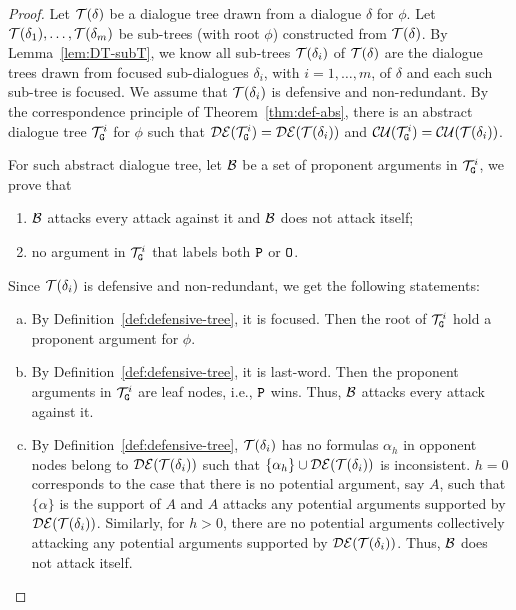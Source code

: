   \begin{proof}
  
  
  Let $\mathcal{T}(\delta)$ be a dialogue tree drawn from a dialogue $\delta$ for $\phi$. Let $\mathcal{T}(\delta_1), \ldots , \mathcal{T}(\delta_m)$ be sub-trees (with root $\phi$) constructed from $\mathcal{T}(\delta)$. By Lemma~\ref{lem:DT-subT}, we know all sub-trees $\mathcal{T}(\delta_i)$ of $\mathcal{T}(\delta)$ are the dialogue trees drawn from focused sub-dialogues $\delta_i$, with $i = 1, \ldots, m$, of $\delta$ and each such sub-tree is focused. We assume that $\mathcal{T}(\delta_i)$ is defensive and non-redundant.
%
  By the correspondence principle of Theorem~\ref{thm:def-abs},  there is an abstract dialogue tree $\mathcal{T}_{\texttt{\textup{G}}}^{i}$ for $\phi$ such that $\mathcal{DE}(\mathcal{T}_{\texttt{\textup{G}}}^{i})  =  \mathcal{DE}(\mathcal{T}(\delta_i))$ and $\mathcal{CU}(\mathcal{T}_{\texttt{\textup{G}}}^{i})  =  \mathcal{CU}(\mathcal{T}(\delta_ i))$.
  
  For such abstract dialogue tree, let $\mathcal{B}$ be a set of proponent arguments in $\mathcal{T}_{\texttt{\textup{G}}}^{i}$, we prove that 
  \begin{enumerate}
      \item $\mathcal{B}$ attacks every attack against it and $\mathcal{B}$ does not attack itself;
      \item no argument in $\mathcal{T}_{\texttt{\textup{G}}}^{i}$ that labels both $\texttt{\textup{P}}$ or $\texttt{\textup{O}}$.
  \end{enumerate}

 Since $\mathcal{T}(\delta_i)$ is defensive and non-redundant, we get the following statements:
  
  \begin{enumerate} [a)]
        \item By Definition~\ref{def:defensive-tree}, it is focused. Then the root of $\mathcal{T}_{\texttt{\textup{G}}}^{i}$ hold a proponent argument for $\phi$.
        
      \item By Definition~\ref{def:defensive-tree}, it is last-word. Then the proponent arguments in $\mathcal{T}_{\texttt{\textup{G}}}^{i}$ are leaf nodes, i.e., $\texttt{\textup{P}}$ wins. Thus, $\mathcal{B}$ attacks every attack against it.

      \item By Definition~\ref{def:defensive-tree}, $\mathcal{T}(\delta_{i})$ has no formulas $\alpha_h$ in opponent nodes belong to $\mathcal{DE}(\mathcal{T}(\delta_i))$ such that $\{ \alpha_h \} \cup \mathcal{DE}(\mathcal{T}(\delta_i))$ is inconsistent. 
      $h = 0$ corresponds to the case that there is no potential argument, say $A$, such that $\{ \alpha \}$ is the support of $A$ and $A$ attacks any potential arguments supported by $\mathcal{DE}(\mathcal{T}(\delta_i))$. 
      Similarly, for $h > 0$, there are no potential arguments collectively attacking any potential arguments supported by $\mathcal{DE}(\mathcal{T}(\delta_i))$.
      Thus, $\mathcal{B}$ does not attack itself.


\end{enumerate}
\end{proof}
